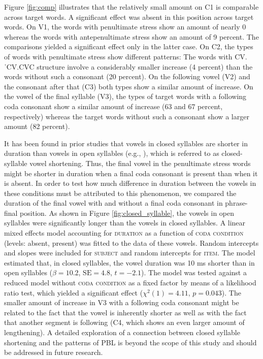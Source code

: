 \documentclass[output=paper]{langscibook}
\begin{document}
Figure \ref{fig:comp} illustrates that the relatively small amount on C1 is comparable across target words. A significant effect was absent in this position across target words. On V1, the words with penultimate stress show an amount of nearly 0 whereas the words with antepenultimate stress show an amount of 9 percent. The comparisons yielded a significant effect only in the latter case. On C2, the types of words with penultimate stress show different patterns: The words with CV.ˈCV.CVC structure involve a considerably smaller increase (4 percent) than the words without such a consonant (20 percent). On the following vowel (V2) and the consonant after that (C3) both types show a similar amount of increase. On the vowel of the final syllable (V3), the types of target words with a following coda consonant show a similar amount of increase (63 and 67 percent, respectively) whereas the target words without such a consonant show a larger amount (82 percent).

It has been found in prior studies that vowels in closed syllables are shorter in duration than vowels in open syllables (e.g., \citealt{Jones1950}), which is referred to as closed-syllable vowel shortening. Thus, the final vowel in the penultimate stress words might be shorter in duration when a final coda consonant is present than when it is absent. In order to test how much difference in duration between the vowels in these conditions must be attributed to this phenomenon, we compared the duration of the final vowel with and without a final coda consonant in phrase-final position. As shown in Figure \ref{fig:closed_syllable}, the vowels in open syllables were significantly longer than the vowels in closed syllables. A linear mixed effects model accounting for \textsc{duration} as a function of \textsc{coda condition} (levels: absent, present) was fitted to the data of these vowels. Random intercepts and slopes were included for \textsc{subject} and random intercepts for \textsc{item}. The model estimated that, in closed syllables, the vowel duration was 10 ms shorter than in open syllables ($\beta=10.2$, $\text{SE}=4.8$, $t=-2.1$). The model was tested against a reduced model without \textsc{coda condition} as a fixed factor by means of a likelihood ratio test, which yielded a significant effect ($\chi^2(1)=4.11$, $p=0.043$). The smaller amount of increase in V3 with a following coda consonant might be related to the fact that the vowel is inherently shorter as well as with the fact that another segment is following (C4, which shows an even larger amount of lengthening). A detailed exploration of a connection between closed syllable shortening and the patterns of PBL is beyond the scope of this study and should be addressed in future research.
\end{document}
